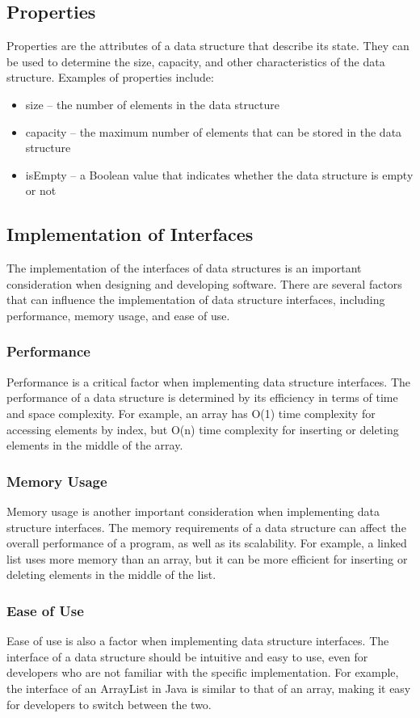 \documentclass[a4paper, 11pt, oneside]{book} %
\begin{document}
\subsection{Properties}
Properties are the attributes of a data structure that describe its state. They can be used to determine the size, capacity, and other characteristics of the data structure. Examples of properties include:
\begin{itemize}
    \item size – the number of elements in the data structure
    \item capacity – the maximum number of elements that can be stored in the data structure
    \item isEmpty – a Boolean value that indicates whether the data structure is empty or not
\end{itemize}

\subsection{Implementation of Interfaces}
The implementation of the interfaces of data structures is an important consideration when designing and developing software. There are several factors that can influence the implementation of data structure interfaces, including performance, memory usage, and ease of use.

\subsubsection{Performance}
Performance is a critical factor when implementing data structure interfaces. The performance of a data structure is determined by its efficiency in terms of time and space complexity. For example, an array has O(1) time complexity for accessing elements by index, but O(n) time complexity for inserting or deleting elements in the middle of the array.
\subsubsection{Memory Usage}
Memory usage is another important consideration when implementing data structure interfaces. The memory requirements of a data structure can affect the overall performance of a program, as well as its scalability. For example, a linked list uses more memory than an array, but it can be more efficient for inserting or deleting elements in the middle of the list.
\subsubsection{Ease of Use}
Ease of use is also a factor when implementing data structure interfaces. The interface of a data structure should be intuitive and easy to use, even for developers who are not familiar with the specific implementation. For example, the interface of an ArrayList in Java is similar to that of an array, making it easy for developers to switch between the two.
\end{document}
